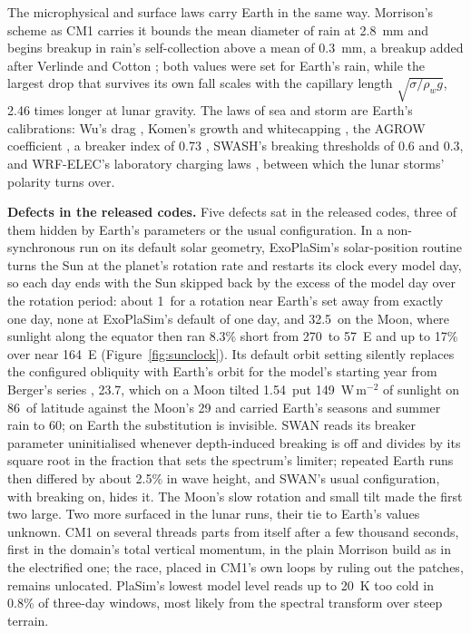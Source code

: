 The microphysical and surface laws carry Earth in the same way. Morrison's scheme as CM1 carries it
\autocite{morrison2005new} bounds the mean diameter of rain at 2.8~mm and begins breakup in rain's
self-collection above a mean of 0.3~mm, a breakup added after Verlinde and Cotton
\autocite{verlinde1993fitting}; both values were set for Earth's rain, while the largest drop that survives
its own fall scales with the capillary length $\sqrt{\sigma/\rho_w g}$, 2.46 times longer at lunar
gravity. The laws of sea and storm are Earth's calibrations: Wu's drag \autocite{wu1982wind},
Komen's growth and whitecapping \autocite{komen1984existence}, the AGROW coefficient
\autocite{cavaleri1981wind}, a breaker index of 0.73 \autocite{battjes1985calibration}, SWASH's breaking
thresholds of 0.6 and 0.3, and WRF-ELEC's laboratory charging laws
\autocite{saunders1998laboratory,takahashi1978riming}, between which the lunar storms' polarity turns
over.

\textbf{Defects in the released codes.} Five defects sat in the released codes, three of them hidden by
Earth's parameters or the usual configuration. In a non-synchronous run on its default solar geometry,
ExoPlaSim's solar-position routine turns the Sun at the planet's rotation rate and restarts its clock every
model day, so each day ends with the Sun skipped back by the excess of the model day over the rotation
period: about 1\textdegree\ for a rotation near Earth's set away from exactly one day, none at ExoPlaSim's
default of one day, and 32.5\textdegree\ on the Moon, where sunlight along the equator then ran 8.3\% short
from 270\textdegree\ to 57\textdegree~E and up to 17\% over near 164\textdegree~E
(Figure~\ref{fig:sunclock}). Its default orbit setting silently replaces the configured obliquity
with Earth's orbit for the model's starting year from Berger's series \autocite{berger1978long},
23.7\textdegree, which on a Moon tilted 1.54\textdegree\ put 149~W\,m$^{-2}$ of sunlight on 86\textdegree\
of latitude against the Moon's 29 and carried Earth's seasons and summer rain to 60\textdegree; on Earth the
substitution is invisible.\claim{H24} SWAN reads its breaker parameter uninitialised whenever depth-induced
breaking is off and divides by its square root in the fraction that sets the spectrum's limiter; repeated
Earth runs then differed by about 2.5\% in wave height, and SWAN's usual configuration, with breaking on,
hides it.\claim{H25} The Moon's slow rotation and small tilt made the first two large. Two more surfaced in the lunar runs, their tie to Earth's values unknown. CM1 on several threads parts from itself after a few
thousand seconds, first in the domain's total vertical momentum, in the plain Morrison build as in the
electrified one; the race, placed in CM1's own loops by ruling out the patches, remains
unlocated.\claim{H26} PlaSim's lowest model level reads up to 20~K too cold in 0.8\% of three-day windows,
most likely from the spectral transform over steep terrain.\claim{H27}

